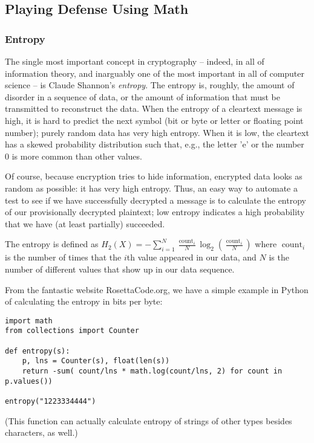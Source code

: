 \documentclass[%
 aip,
 jmp,%
 amsmath,amssymb,
 reprint,%
]{revtex4-1}
\begin{document}
\subsection{Playing Defense Using Math}

\subsubsection{Entropy}

The single most important concept in cryptography -- indeed, in all of
information theory, and inarguably one of the most important in all of
computer science -- is Claude Shannon's \emph{entropy}.  The entropy is,
roughly, the amount of disorder in a sequence of data, or the amount
of information that must be transmitted to reconstruct the data.  When
the entropy of a cleartext message is high, it is hard to predict the
next symbol (bit or byte or letter or floating point number); purely
random data has very high entropy.  When it is low, the cleartext has
a skewed probability distribution such that, e.g., the letter 'e' or
the number 0 is more common than other values.

Of course, because encryption tries to hide information, encrypted
data looks as random as possible: it has very high entropy.  Thus, an
easy way to automate a test to see if we have successfully decrypted a
message is to calculate the entropy of our provisionally decrypted
plaintext; low entropy indicates a high probability that we have (at
least partially) succeeded.

The entropy is defined as
$H_{2}(X)=-\sum_{i=1}^{N} \frac{\operatorname{count}_{i}}{N} \log
_{2}\left(\frac{\operatorname{count}_{i}}{N}\right)$
where $\operatorname{count}_i$ is the number of times that the $i$th
value appeared in our data, and $N$ is the number of different values
that show up in our data sequence.

From the fantastic website RosettaCode.org, we have a simple example
in Python of calculating the entropy in bits per byte:

\begin{verbatim}
import math
from collections import Counter

def entropy(s):
    p, lns = Counter(s), float(len(s))
    return -sum( count/lns * math.log(count/lns, 2) for count in p.values())

entropy("1223334444")
\end{verbatim}

(This function can actually calculate entropy of strings of other
types besides characters, as well.)
\end{document}
